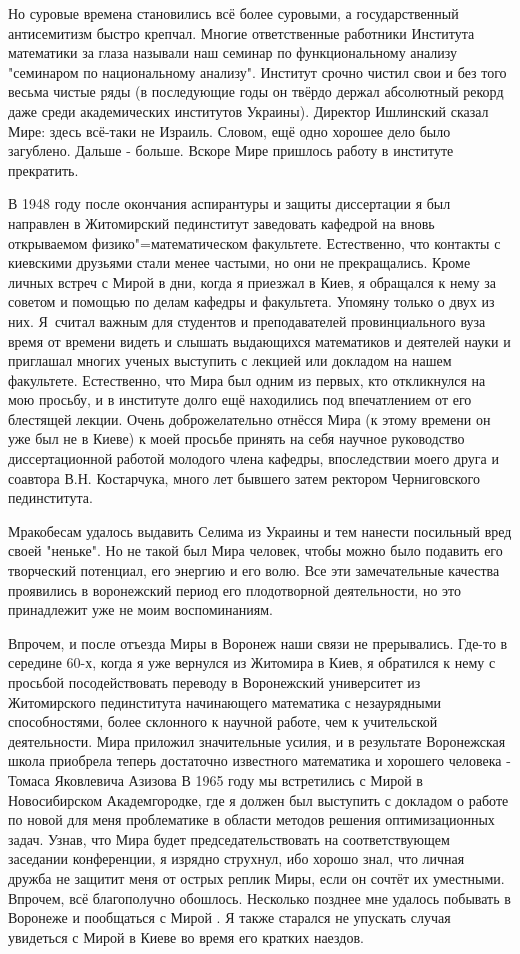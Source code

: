 Но суровые времена становились всё более суровыми, а государственный антисемитизм быстро крепчал. Многие ответственные работники Института математики за глаза называли наш семинар по функциональному анализу "семинаром по национальному анализу". Институт срочно чистил свои и без того весьма чистые ряды (в последующие годы он твёрдо держал абсолютный рекорд даже среди академических институтов Украины). Директор Ишлинский сказал Мире: здесь всё-таки не Израиль. Словом, ещё одно хорошее дело было загублено. Дальше - больше. Вскоре Мире пришлось работу в институте прекратить.

В 1948 году после окончания аспирантуры и защиты диссертации я был направлен
в Житомирский пединститут заведовать кафедрой на вновь открываемом фи\-зи\-ко"=ма\-те\-ма\-ти\-че\-с\-ком факультете.
Естественно, что контакты с киевскими друзьями стали менее частыми, но они не прекращались.
Кроме личных встреч с Мирой в дни, когда я приезжал в Киев,
я обращался к нему за советом и помощью по делам кафедры и факультета. Упомяну только о двух из них.
Я~считал важным для студентов и преподавателей провинциального вуза время от времени видеть и слышать выдающихся математиков и деятелей науки и приглашал многих ученых выступить с лекцией или докладом на нашем факультете. Естественно, что Мира был одним из первых, кто откликнулся на мою просьбу, и в институте долго ещё находились под впечатлением от его блестящей лекции. Очень доброжелательно отнёсся Мира (к этому времени он уже был не в Киеве) к моей просьбе принять на себя научное руководство диссертационной работой молодого члена кафедры, впоследствии моего друга и соавтора В.Н. Костарчука, много лет бывшего затем ректором Черниговского пединститута.

Мракобесам удалось выдавить Селима из Украины и тем нанести посильный вред своей "неньке". Но не такой был Мира человек, чтобы можно было подавить его творческий потенциал, его энергию и его волю. Все эти замечательные качества проявились в воронежский период его плодотворной деятельности, но это принадлежит уже не моим воспоминаниям.

Впрочем, и после отъезда Миры в Воронеж наши связи не прерывались. Где-то в середине 60-х, когда я уже вернулся из Житомира в Киев, я обратился к нему с просьбой посодействовать переводу в Воронежский университет из Житомирского пединститута начинающего математика с незаурядными способностями, более склонного к научной работе, чем к учительской деятельности. Мира приложил значительные усилия, и в результате Воронежская школа приобрела теперь достаточно известного математика и хорошего человека - Томаса Яковлевича Азизова В 1965 году мы встретились с Мирой в Новосибирском Академгородке, где я должен был выступить с докладом о работе по новой для меня проблематике в области методов решения оптимизационных задач. Узнав, что Мира будет председательствовать на соответствующем заседании конференции, я изрядно струхнул, ибо хорошо знал, что личная дружба не защитит меня от острых реплик Миры, если он сочтёт их уместными. Впрочем, всё благополучно обошлось. Несколько позднее мне удалось побывать в Воронеже и пообщаться с Мирой . Я также старался не упускать случая увидеться с Мирой в Киеве во время его кратких наездов.

